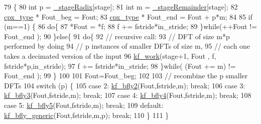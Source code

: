 \begin{DoxyCode}
79         \{
80             \textcolor{keywordtype}{int} p = \hyperlink{classkissfft_a89d4645ae457422179835a92f2e4bf7c}{\_stageRadix}[stage];
81             \textcolor{keywordtype}{int} m = \hyperlink{classkissfft_a112fd0185ddaaf837cab9e7abb839d13}{\_stageRemainder}[stage];
82             \hyperlink{classkissfft_af66664488b0b1b2995f3e4c2f63a8b7d}{cpx\_type} * Fout\_beg = Fout;
83             \hyperlink{classkissfft_af66664488b0b1b2995f3e4c2f63a8b7d}{cpx\_type} * Fout\_end = Fout + p*m;
84 
85             \textcolor{keywordflow}{if} (m==1) \{
86                 \textcolor{keywordflow}{do}\{
87                     *Fout = *f;
88                     f += fstride*in\_stride;
89                 \}\textcolor{keywordflow}{while}(++Fout != Fout\_end );
90             \}\textcolor{keywordflow}{else}\{
91                 \textcolor{keywordflow}{do}\{
92                     \textcolor{comment}{// recursive call:}
93                     \textcolor{comment}{// DFT of size m*p performed by doing}
94                     \textcolor{comment}{// p instances of smaller DFTs of size m, }
95                     \textcolor{comment}{// each one takes a decimated version of the input}
96                     \hyperlink{classkissfft_a33dc368507355e068428fb51bb42ba56}{kf\_work}(stage+1, Fout , f, fstride*p,in\_stride);
97                     f += fstride*in\_stride;
98                 \}\textcolor{keywordflow}{while}( (Fout += m) != Fout\_end );
99             \}
100 
101             Fout=Fout\_beg;
102 
103             \textcolor{comment}{// recombine the p smaller DFTs }
104             \textcolor{keywordflow}{switch} (p) \{
105                 \textcolor{keywordflow}{case} 2: \hyperlink{classkissfft_a88750fa038b343d9e94bdcefc66cf604}{kf\_bfly2}(Fout,fstride,m); \textcolor{keywordflow}{break};
106                 \textcolor{keywordflow}{case} 3: \hyperlink{classkissfft_a5eafd09bfe32414e9efca3f74ca99266}{kf\_bfly3}(Fout,fstride,m); \textcolor{keywordflow}{break};
107                 \textcolor{keywordflow}{case} 4: \hyperlink{classkissfft_a64876ee331b8349c63873207a87880db}{kf\_bfly4}(Fout,fstride,m); \textcolor{keywordflow}{break};
108                 \textcolor{keywordflow}{case} 5: \hyperlink{classkissfft_af6b0264b4e13de975edaa006b2ab98b6}{kf\_bfly5}(Fout,fstride,m); \textcolor{keywordflow}{break};
109                 \textcolor{keywordflow}{default}: \hyperlink{classkissfft_abf9a27bb71715184e6886ee38c371650}{kf\_bfly\_generic}(Fout,fstride,m,p); \textcolor{keywordflow}{break};
110             \}
111         \}
\end{DoxyCode}
